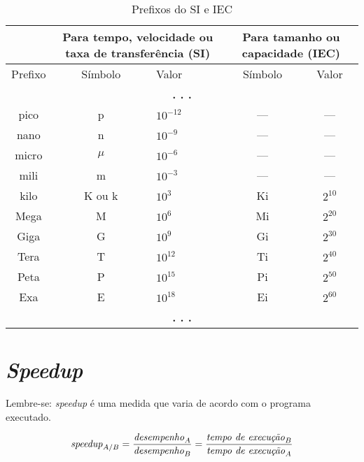 \documentclass[12pt]{article}
\newcommand{\Text}[1]{\textrm{\textit{#1}}}
\begin{document}
\begin{table}[h]
  \centering
  \caption{Prefixos do SI e IEC}\smallskip
  \label{tab:prefixos}
  \begin{tabular}{|c|c|l|c|c|} \hline
    & \multicolumn{2}{|p{3.4cm}|}{Para tempo, velocidade ou taxa de transferência (SI)} & \multicolumn{2}{|p{2.8cm}|}{Para tamanho ou capacidade (IEC)} \\ \hline
    Prefixo & Símbolo & Valor    & Símbolo & Valor          \\ \hline
    \multicolumn{5}{c}{\textbf{. . .}} \\ \hline
    pico    & p       & \(10^{-12}\) & ---     & ---                 \\ %
    nano    & n       & \(10^{-9}\)  & ---     & ---                 \\ %
    micro   & \(\mu\) & \(10^{-6}\)  & ---     & ---                 \\ %
    mili    & m       & \(10^{-3}\)  & ---     & ---                 \\ %
    kilo    & K ou k  & \(10^3\)     & Ki      & \(2^{10}\) \\ %
    Mega    & M       & \(10^6\)     & Mi      & \(2^{20}\) \\ %
    Giga    & G       & \(10^9\)     & Gi      & \(2^{30}\) \\ %
    Tera    & T       & \(10^{12}\)  & Ti      & \(2^{40}\) \\ %
    Peta    & P       & \(10^{15}\)  & Pi      & \(2^{50}\) \\ %
    Exa     & E       & \(10^{18}\)  & Ei      & \(2^{60}\) \\ \hline %
    \multicolumn{5}{c}{\textbf{. . .}} \\
  \end{tabular}
\end{table}


\section{\textit{Speedup}}


Lembre-se: \textit{speedup} é uma medida que varia de acordo com o programa executado.

\begin{equation} \label{eq:speedup}
  \Text{speedup}_{A/B} =
  \frac{\Text{desempenho}_A}{\Text{desempenho}_B} =
  \frac{\Text{tempo de execução}_B}{\Text{tempo de execução}_A}
\end{equation}
\end{document}

